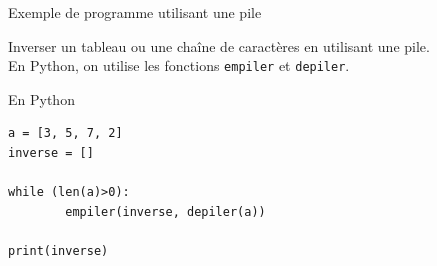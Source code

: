 \documentclass[10pt]{beamer}
\begin{document}
\begin{frame}[fragile]{Exemple de programme utilisant une pile}


Inverser un tableau ou une chaîne de caractères en utilisant une pile. \\

En Python, on utilise les fonctions \texttt{empiler} et \texttt{depiler}. 

\vspace{0.5 cm}

\begin{exampleblock}{En Python}
\begin{verbatim} 
a = [3, 5, 7, 2]
inverse = []

while (len(a)>0):
        empiler(inverse, depiler(a))

print(inverse) 
\end{verbatim}
\end{exampleblock}

\vspace{0.5 cm}


\end{frame}
\end{document}
